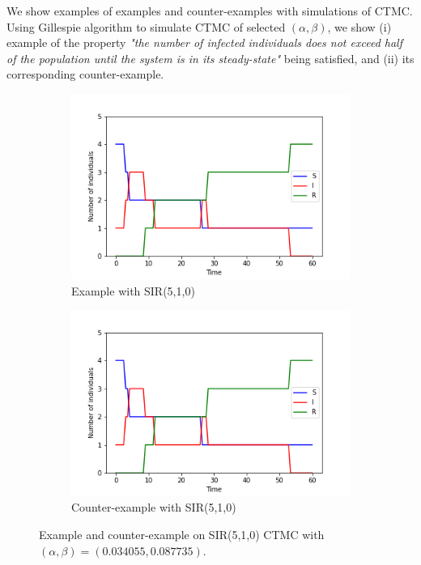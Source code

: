 We show examples of examples and counter-examples with simulations of CTMC. Using Gillespie
algorithm \cite{gillespie1976general} to simulate CTMC of selected $(\alpha, \beta)$, we show (i)
example of the property \textit{"the number of infected individuals does not exceed half of the
    population until the system is in its steady-state"} being satisfied, and (ii) its corresponding
counter-example.
\begin{figure}[H]
    \centering
    \begin{subfigure}{0.48\textwidth}
        \centering
        \includegraphics[width=\linewidth]{figures/sir_510_trace_1.png}
        \caption{Example with SIR(5,1,0)}
    \end{subfigure}
    \hfill
    \begin{subfigure}{0.48\textwidth}
        \centering
        \includegraphics[width=\linewidth]{figures/sir_510_trace_1.png}
        \caption{Counter-example with SIR(5,1,0)}
    \end{subfigure}
    \caption{Example and counter-example on SIR(5,1,0) CTMC with $(\alpha, \beta)=(0.034055, 0.087735)$.}
\end{figure}
